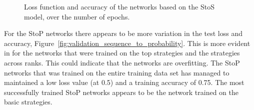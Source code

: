 \begin{figure}[!htbp]
\begin{subfigure}{\textwidth}
    \end{subfigure}
    \caption{Loss function and accuracy of the networks based on the StoS model,
    over the number of epochs.}\label{fig:validation_sequence_to_sequence}
\end{figure}

For the StoP networks there appears to be more variation in the test loss and
accuracy, Figure~\ref{fig:validation_sequence_to_probability}. This is more evident
in for the networks that were trained on the top strategies and the strategies
across ranks. This could indicate that the networks are overfitting. The StoP
networks that was trained on the entire training data set has managed to maintained
a low loss value (at 0.5) and a training accuracy of 0.75. The most successfully
trained StoP networks appears to be the network trained on the basic strategies.

